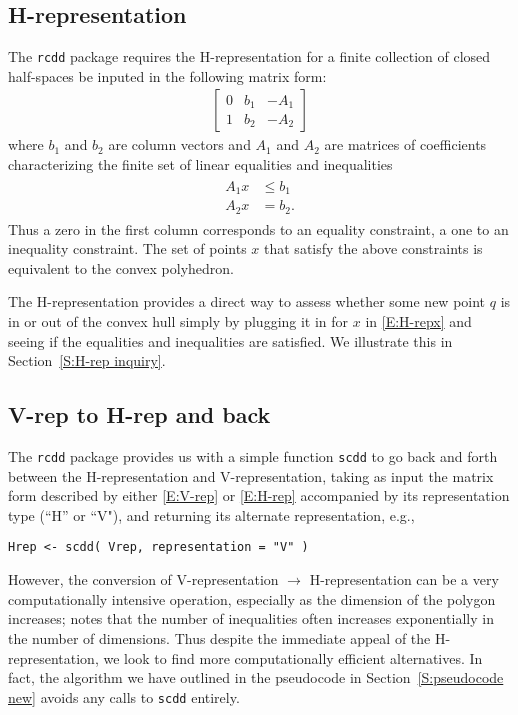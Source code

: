 \subsection{H-representation} \label{S:H-rep}
The \texttt{rcdd} package requires the H-representation for a finite
collection of closed half-spaces be inputed in the following matrix form:
\begin{align} \label{E:H-rep}
	\left[\begin{array}{ccc}	0 & b_1 & -A_1 \\ 1 & b_2 & -A_2
	\end{array}\right]
\end{align}
where $b_1$ and $b_2$ are column vectors and $A_1$ and $A_2$ are matrices 
of coefficients characterizing the finite set of 
linear equalities and inequalities
\begin{align} \label{E:H-repx}
\begin{split}
	A_1 x &\leq b_1 \\
	A_2 x &= b_2.
\end{split}
\end{align}
Thus a zero in the first column corresponds to an equality constraint, a one to
an inequality constraint.
The set of points $x$ that satisfy the above constraints is equivalent to the
convex polyhedron.

The H-representation provides a direct
way to assess whether some new point $q$ is in or out of the convex hull
simply by plugging it in for $x$ in \eqref{E:H-repx} and seeing if the equalities
and inequalities are satisfied.  We illustrate this in Section~\ref{S:H-rep inquiry}.

\subsection{V-rep to H-rep and back}
The \texttt{rcdd} package provides us with a simple function \texttt{scdd}
to go back and forth between the H-representation and V-representation, taking as input
the matrix form described by either \eqref{E:V-rep} or \eqref{E:H-rep} accompanied
by its representation type (``H'' or ``V"), and returning its alternate representation, e.g.,
\begin{verbatim}
Hrep <- scdd( Vrep, representation = "V" )
\end{verbatim}

However, the conversion of V-representation $\rightarrow$ H-representation 
can be a very computationally intensive operation, especially as the dimension 
of the polygon increases;
\citet{Fukuda:2008} notes that the number of inequalities often increases 
exponentially in the number of dimensions.  Thus despite the immediate appeal
of the H-representation, we look to find more computationally efficient alternatives.
In fact, the algorithm we have outlined in the pseudocode in Section~\ref{S:pseudocode new} avoids any calls to \texttt{scdd} entirely.


